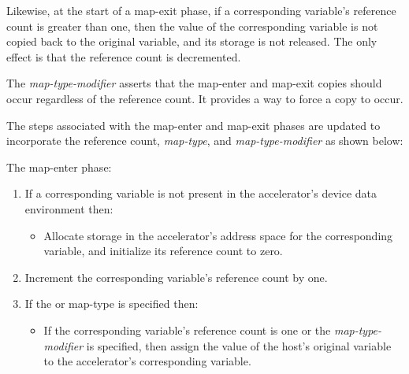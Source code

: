 Likewise, at the start of a map-exit phase, if a corresponding variable's
reference count is greater than one, then the value of the corresponding
variable is not copied back to the original variable, and its storage is not
released.  The only effect is that the reference count is decremented.



The  \emph{map-type-modifier} asserts that the map-enter and
map-exit copies should occur regardless of the reference count.  It
provides a way to force a copy to occur.

The steps associated with the map-enter and map-exit phases are updated to
incorporate the reference count, \emph{map-type}, and \emph{map-type-modifier}
as shown below:

The map-enter phase: \begin{enumerate}

  \item If a corresponding variable is not present in the accelerator's device
  data environment then: \begin{itemize}
     
    \item Allocate storage in the accelerator's address space for the
    corresponding variable, and initialize its reference count to zero.

  \end{itemize}

  \item Increment the corresponding variable's reference count by one.

  \item If the  or  map-type is specified then:
  \begin{itemize}

    \item If the corresponding variable's reference count is one or the
     \emph{map-type-modifier} is specified, then assign the value of the
    host's original variable to the accelerator's corresponding variable.

  \end{itemize}

\end{enumerate}

